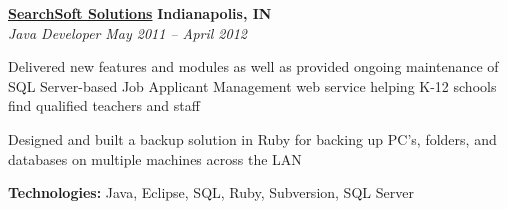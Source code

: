%
    \headerrow
        {\textbf{\href{http://www.searchsoft.net/}{SearchSoft Solutions}}}
        {\textbf{Indianapolis, IN}}
    \\
    \headerrow
        {\emph{Java Developer}}
        {\emph{May 2011 -- April 2012}}
    \begin{itemize*}
        \item Delivered new features and modules as well as provided ongoing maintenance of SQL Server-based
                Job Applicant Management web service helping K-12 schools find qualified teachers and staff
        \item Designed and built a backup solution in Ruby for backing up PC's, folders, and databases on multiple
                machines across the LAN
    \end{itemize*}

    \hspace{1.0em}
    \textbf{Technologies:} Java, Eclipse, SQL, Ruby, Subversion, SQL Server

